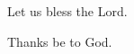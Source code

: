 \documentclass[12pt]{book}
\begin{document}


\noindent \vv Let us bless the Lord.

\noindent \rr Thanks be to God.

    

\end{document}
